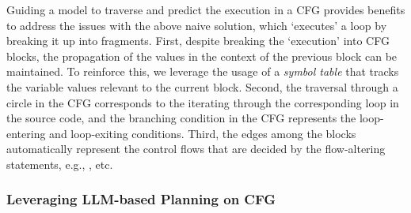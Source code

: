 
Guiding a model to traverse and predict the execution in a CFG
provides benefits to address the issues with the above naive solution,
which `executes' a loop by breaking it up into fragments. First,
despite breaking the `execution' into CFG blocks, the propagation of the
values in the context of the previous block can be maintained. To
reinforce this, we leverage the usage of a {\em symbol table} that
tracks the variable values relevant to the current block. Second, the
traversal through a circle in the CFG corresponds to the iterating
through the corresponding loop in the source code, and the branching
condition in the CFG represents the loop-entering and loop-exiting
conditions. Third, the edges among the blocks automatically represent
the control flows that are decided by the flow-altering
statements, e.g., , etc.



\subsubsection{Leveraging LLM-based Planning on CFG}


